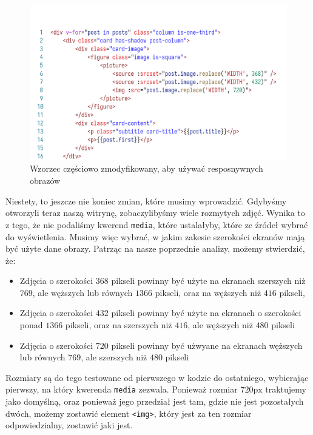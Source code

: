 \documentclass[licencjacka]{pracadypl}
\begin{document}
\begin{figure}[H]
  \includegraphics[width=\linewidth]{images/code-vue-image-card-mid.png}
  \caption{Wzorzec częściowo zmodyfikowany, aby używać resposnywnych obrazów}
  \label{fig:code-vue-template-articles-mid}
\end{figure}

Niestety, to jeszcze nie koniec zmian, które musimy wprowadzić. Gdybyśmy otworzyli teraz naszą witrynę, zobaczylibyśmy wiele rozmytych zdjęć. Wynika to z tego, że nie podaliśmy kwerend \texttt{media}, które ustalałyby, które ze źródeł wybrać do wyświetlenia. Musimy więc wybrać, w jakim zakesie szerokości ekranów mają być użyte dane obrazy. Patrząc na nasze poprzednie analizy, możemy stwierdzić, że:

\begin{itemize}
  \item Zdjęcia o szerokości $368$ pikseli powinny być użyte na ekranach szerszych niż $769$, ale węższych lub równych $1366$ pikseli, oraz na węższych niż $416$ pikseli,
  \item Zdjęcia o szerokości $432$ pikseli powinny być użyte na ekranach o szerokości ponad $1366$ pikseli, oraz na szerszych niż $416$, ale węższych niż $480$ pikseli
  \item Zdjęcia o szerokości $720$ pikseli powinny być użwyane na ekranach węższych lub równych $769$, ale szerszych niż $480$ pikseli
\end{itemize}

Rozmiary są do tego testowane od pierwszego w kodzie do ostatniego, wybierając pierwszy, na który kwerenda \texttt{media} zezwala. Ponieważ rozmiar $720\text{px}$ traktujemy jako domyślną, oraz ponieważ jego przedział jest tam, gdzie nie jest pozostałych dwóch, możemy zostawić element \texttt{<img>}, który jest za ten rozmiar odpowiedzialny, zostawić jaki jest.
\end{document}
